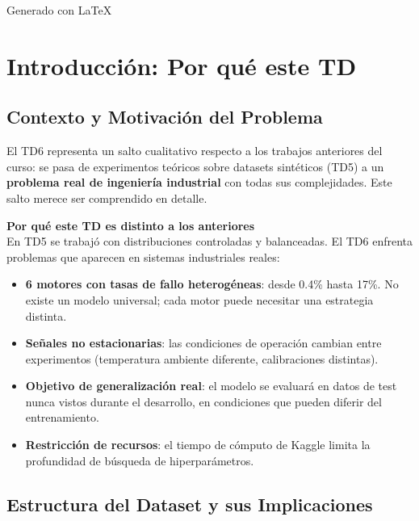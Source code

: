 \documentclass[12pt,a4paper]{article}
\begin{document}
\begin{titlepage}
\vfill
{\small Generado con \LaTeX{}}
\end{titlepage}

\tableofcontents
\newpage

\section{Introducci\'{o}n: Por qu\'{e} este TD}

\subsection{Contexto y Motivaci\'{o}n del Problema}

El TD6 representa un salto cualitativo respecto a los trabajos anteriores del curso:
se pasa de experimentos te\'{o}ricos sobre datasets sint\'{e}ticos (TD5) a un \textbf{problema
real de ingenier\'{i}a industrial} con todas sus complejidades. Este salto merece ser
comprendido en detalle.

\begin{porquebox}
\textbf{Por qu\'{e} este TD es distinto a los anteriores}\\[4pt]
En TD5 se trabaj\'{o} con distribuciones controladas y balanceadas. El TD6 enfrenta
problemas que aparecen en sistemas industriales reales:
\begin{itemize}[itemsep=2pt]
  \item \textbf{6 motores con tasas de fallo heterog\'{e}neas}: desde 0.4\% hasta 17\%.
    No existe un modelo universal; cada motor puede necesitar una estrategia distinta.
  \item \textbf{Se\~{n}ales no estacionarias}: las condiciones de operaci\'{o}n cambian entre
    experimentos (temperatura ambiente diferente, calibraciones distintas).
  \item \textbf{Objetivo de generalizaci\'{o}n real}: el modelo se evaluar\'{a} en datos de test
    nunca vistos durante el desarrollo, en condiciones que pueden diferir del
    entrenamiento.
  \item \textbf{Restricci\'{o}n de recursos}: el tiempo de c\'{o}mputo de Kaggle limita
    la profundidad de b\'{u}squeda de hiperpar\'{a}metros.
\end{itemize}
\end{porquebox}

\subsection{Estructura del Dataset y sus Implicaciones}
\end{document}
